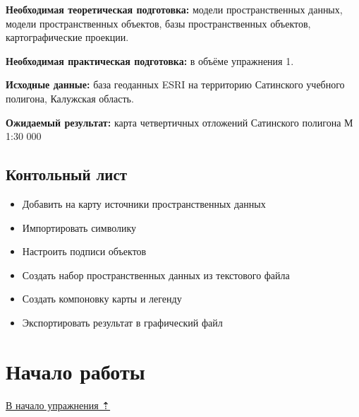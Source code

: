\documentclass[
  12pt,
]{book}
\providecommand{\tightlist}{%
  \setlength{\itemsep}{0pt}\setlength{\parskip}{0pt}}
\begin{document}
\textbf{Необходимая теоретическая подготовка:} модели пространственных данных, модели пространственных объектов, базы пространственных объектов, картографические проекции.

\textbf{Необходимая практическая подготовка:} в объёме упражнения 1.

\textbf{Исходные данные:} база геоданных ESRI на территорию Сатинского учебного полигона, Калужская область.

\textbf{Ожидаемый результат:} карта четвертичных отложений Сатинского полигона М 1:30 000

\hypertarget{map-design-quaternary-checklist}{%
\subsection{Контольный лист}\label{map-design-quaternary-checklist}}

\begin{itemize}
\tightlist
\item
  Добавить на карту источники пространственных данных
\item
  Импортировать символику
\item
  Настроить подписи объектов
\item
  Создать набор пространственных данных из текстового файла
\item
  Создать компоновку карты и легенду
\item
  Экспортировать результат в графический файл
\end{itemize}

\hypertarget{map-design-quaternary-begin}{%
\section{Начало работы}\label{map-design-quaternary-begin}}

\protect\hyperlink{map-design-quaternary}{В начало упражнения ⇡}
\end{document}
